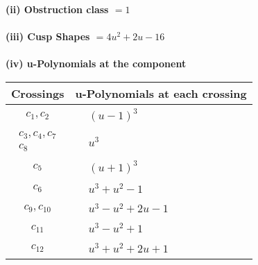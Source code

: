 \documentclass[1p]{elsarticle_modified}
\theoremstyle{definition}
\begin{document}
\flushleft \textbf{(ii) Obstruction class $= 1$}\\~\\
\flushleft \textbf{(iii) Cusp Shapes $= 4 u^2+2 u-16$}\\~\\
\newpage\renewcommand{\arraystretch}{1}
\flushleft \textbf{(iv) u-Polynomials at the component}\newline \\
\begin{tabular}{m{50pt}|m{274pt}}
Crossings & \hspace{64pt}u-Polynomials at each crossing \\
\hline $$\begin{aligned}c_{1},c_{2}\end{aligned}$$&$\begin{aligned}
&(u-1)^3
\end{aligned}$\\
\hline $$\begin{aligned}c_{3},c_{4},c_{7}\\c_{8}\end{aligned}$$&$\begin{aligned}
&u^3
\end{aligned}$\\
\hline $$\begin{aligned}c_{5}\end{aligned}$$&$\begin{aligned}
&(u+1)^3
\end{aligned}$\\
\hline $$\begin{aligned}c_{6}\end{aligned}$$&$\begin{aligned}
&u^3+u^2-1
\end{aligned}$\\
\hline $$\begin{aligned}c_{9},c_{10}\end{aligned}$$&$\begin{aligned}
&u^3- u^2+2 u-1
\end{aligned}$\\
\hline $$\begin{aligned}c_{11}\end{aligned}$$&$\begin{aligned}
&u^3- u^2+1
\end{aligned}$\\
\hline $$\begin{aligned}c_{12}\end{aligned}$$&$\begin{aligned}
&u^3+u^2+2 u+1
\end{aligned}$\\
\hline
\end{tabular}\\~\\
\end{document}
